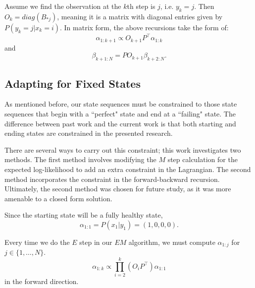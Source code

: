 \documentclass[english]{article}
\numberwithin{equation}{section}
\DeclarePairedDelimiter\paren{(}{)}           %
\begin{document}
	Assume we find the observation at the $k$th step is $j$, i.e. $y_k=j$. Then $O_{k} = diag(B_{*j})$, meaning it is a matrix with diagonal entries given by $P(y_k=j|x_k=i)$. In matrix form, the above recursions take the form of:
	$$\alpha_{1:k+1} \propto O_{k+1}P^{\top} \alpha_{1:k}$$
	and
	$$\beta_{k+1:N}=PO_{k+1}\beta_{k+2:N}.$$
	
%	
%	
%	
%	
	
	\subsection*{Adapting for Fixed States}
	As mentioned before, our state sequences must be constrained to those state sequences that begin with a ``perfect" state and end at a ``failing" state. The difference between past work and the current work is that both starting and ending states are constrained in the presented research.
	
	There are several ways to carry out this constraint; this work investigates two methods. The first method involves modifying the $M$ step calculation for the expected log-likelihood to add an extra constraint in the Lagrangian. The second method incorporates the constraint in the forward-backward recursion. Ultimately, the second method was chosen for future study, as it was more amenable to a closed form solution.
	
	Since the starting state will be a fully healthy state,
	$$\alpha_{1:1}=P(x_1|y_1)=(1,0,0,0).$$
	
	Every time we do the $E$ step in our $EM$ algorithm, we must compute $\alpha_{1:j}$ for $j\in \{1,\ldots,N\}$.
	$$\alpha_{1:k}\propto \prod_{i=2}^k (O_{i}P^{\top})\alpha_{1:1}$$ in the forward direction. 
	
\end{document}
